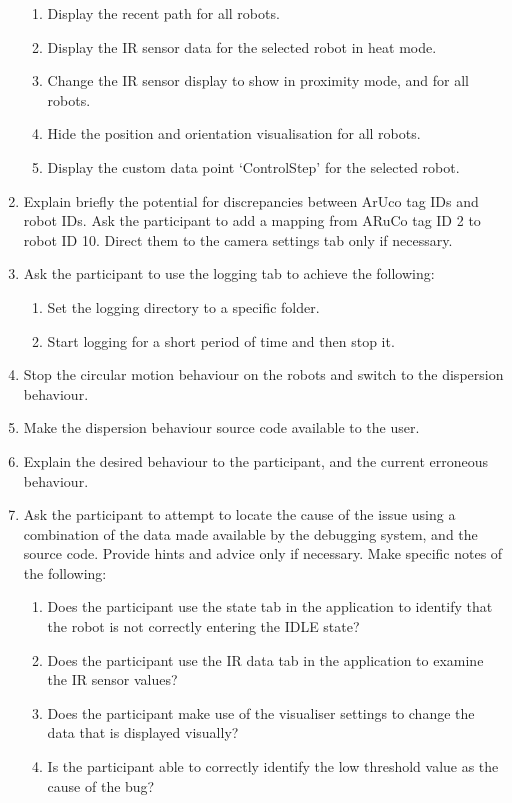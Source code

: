 \begin{enumerate}
\begin{enumerate}
  \item Display the recent path for all robots.
  \item Display the IR sensor data for the selected robot in heat mode.
  \item Change the IR sensor display to show in proximity mode, and for all robots.
  \item Hide the position and orientation visualisation for all robots.
  \item Display the custom data point `ControlStep' for the selected robot.
 \end{enumerate}
 \item Explain briefly the potential for discrepancies between ArUco tag IDs and robot IDs. Ask the participant to add a mapping from ARuCo tag ID 2 to robot ID 10. Direct them to the camera settings tab only if necessary.
 \item Ask the participant to use the logging tab to achieve the following:
 \begin{enumerate}
  \item Set the logging directory to a specific folder.
  \item Start logging for a short period of time and then stop it.
 \end{enumerate}
 \item Stop the circular motion behaviour on the robots and switch to the dispersion behaviour.
 \item Make the dispersion behaviour source code available to the user.
 \item Explain the desired behaviour to the participant, and the current erroneous behaviour.
 \item Ask the participant to attempt to locate the cause of the issue using a combination of the data made available by the debugging system, and the source code. Provide hints and advice only if necessary. Make specific notes of the following:
 \begin{enumerate}
  \item Does the participant use the state tab in the application to identify that the robot is not correctly entering the IDLE state?
  \item Does the participant use the IR data tab in the application to examine the IR sensor values?
  \item Does the participant make use of the visualiser settings to change the data that is displayed visually?
  \item Is the participant able to correctly identify the low threshold value as the cause of the bug?
 \end{enumerate}
\end{enumerate}

